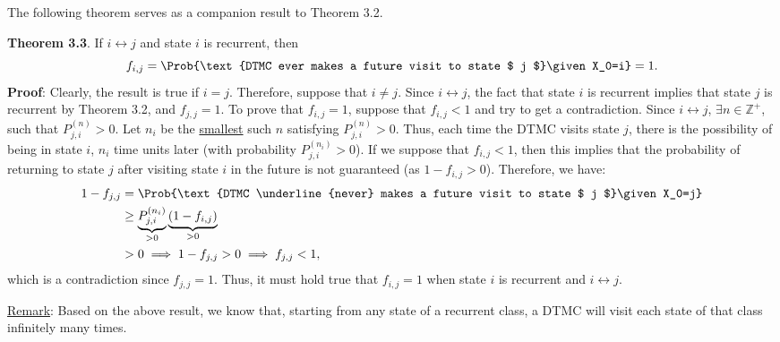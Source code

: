 The following theorem serves as a companion result to Theorem 3.2.
\begin{Result}
    \textbf{Theorem 3.3}. If $ i\leftrightarrow j $ and state $ i $ is recurrent, then
    \[ f_{i,j}=\Prob{\text{DTMC ever makes a future visit to state $ j $}\given X_0=i}=1. \]
    \tcblower{}
    \textbf{Proof}: Clearly, the result is true if $ i=j $. Therefore, suppose
    that $ i\ne j $. Since $ i\leftrightarrow j $, the fact that state $ i $
    is recurrent implies that state $ j $ is recurrent by Theorem 3.2,
    and $ f_{j,j}=1 $. To prove that $ f_{i,j}=1 $, suppose that $ f_{i,j}<1 $
    and try to get a contradiction. Since $ i\leftrightarrow j $,
    $ \exists n\in\mathbb{Z}^+ $, such that $ P_{j,i}^{(n)}>0 $. Let
    $ n_i $ be the \underline{smallest} such $ n $ satisfying
    $ P_{j,i}^{(n)}>0 $. Thus, each time the DTMC visits state $ j $,
    there is the possibility of being in state $ i $, $ n_i $ time
    units later (with probability $ P_{j,i}^{(n_i)}>0 $). If we suppose that
    $ f_{i,j}<1 $, then this implies that the probability of
    returning to state $ j $ after visiting state $ i $ in the
    future is not guaranteed (as $1-f_{i,j}>0$). Therefore, we have:
    \begin{align*}
        1-f_{j,j}
         & =\Prob{\text{DTMC \underline{never} makes a future visit to state $ j $}\given X_0=j} \\
         & \ge \underbrace{P_{j,i}^{(n_i)}}_{>0}\underbrace{(1-f_{i,j})}_{>0}                    \\
         & >0\implies 1-f_{j,j}>0\implies f_{j,j}<1,
    \end{align*}
    which is a contradiction since $ f_{j,j}=1 $. Thus, it must hold true
    that $ f_{i,j}=1 $ when state $ i $ is recurrent and $ i\leftrightarrow j $.
\end{Result}
\underline{Remark}: Based on the above result, we know that, starting from any state of a recurrent class,
a DTMC will visit each state of that class infinitely many times.

